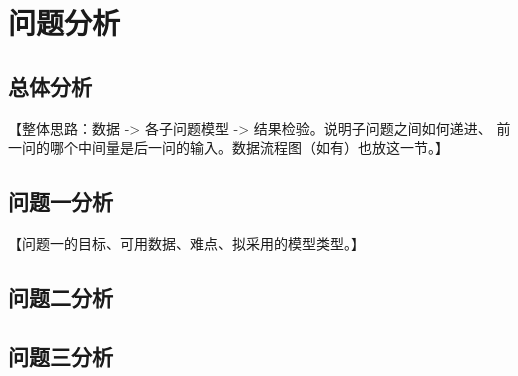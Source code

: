 \section{问题分析}

\subsection{总体分析}

【整体思路：数据 -> 各子问题模型 -> 结果检验。说明子问题之间如何递进、
前一问的哪个中间量是后一问的输入。数据流程图（如有）也放这一节。】


\subsection{问题一分析}

【问题一的目标、可用数据、难点、拟采用的模型类型。】

\subsection{问题二分析}

\subsection{问题三分析}
